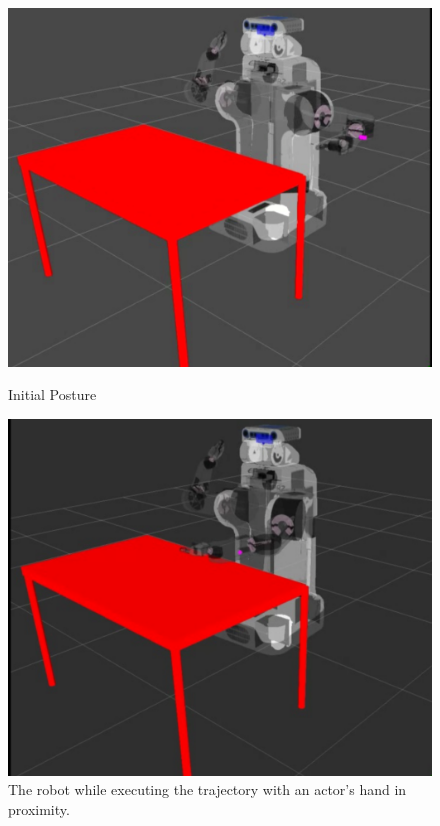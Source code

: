 \begin{figure}[!htb]
  \includegraphics[width=\linewidth]{doa/images/traj1.png}
  \caption{Initial Posture}\label{fig:init}
\endminipage
{}
  \vspace{0.15\textwidth}
  \includegraphics[width=\linewidth]{doa/images/traj4.png}
  \caption{The robot while executing the trajectory with an actor's hand in proximity.}\label{fig:traj2}
\endminipage\hfill
{}%
  \vspace{0.2\textwidth}

\end{figure}
